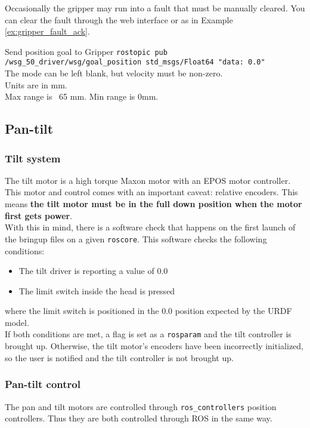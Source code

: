 Occasionally the gripper may run into a fault that must be manually cleared. 
You can clear the fault through the web interface or as in Example \ref{ex:gripper_fault_ack}.

\begin{example}{Send position goal to Gripper}
  \label{ex:gripper_pos_goal}
    \texttt{rostopic pub /wsg\_50\_driver/wsg/goal\_position std\_msgs/Float64 "data: 0.0"} \\
    
    The mode can be left blank, but velocity must be non-zero. \\
    Units are in mm. \\
    Max range is ~65 mm. Min range is 0mm.
\end{example}


\subsection{Pan-tilt}
\subsubsection{Tilt system}
The tilt motor is a high torque Maxon motor with an EPOS motor controller. 
This motor and control comes with an important caveat: relative encoders. 
This means \textbf{the tilt motor must be in the full down position when the motor first gets power}. \\

With this in mind, there is a software check that happens on the first launch of the bringup files on a given \texttt{roscore}. 
This software checks the following conditions:
\begin{itemize}
  \item The tilt driver is reporting a value of 0.0
  \item The limit switch inside the head is pressed
\end{itemize}

where the limit switch is positioned in the 0.0 position expected by the URDF model. \\

If both conditions are met, a flag is set as a \texttt{rosparam} and the tilt controller is brought up. 
Otherwise, the tilt motor's encoders have been incorrectly initialized, so the user is notified and the tilt controller is not brought up. \\


\subsubsection{Pan-tilt control}
The pan and tilt motors are controlled through \texttt{ros\_controllers} position controllers. 
Thus they are both controlled through ROS in the same way. \\

